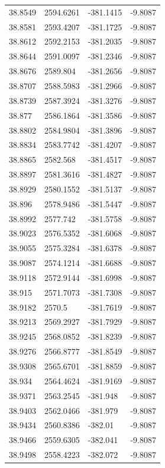 \begin{table}[H]
\begin{tabular}{llll}
38.8549 & 2594.6261 & -381.1415 & -9.8087 \\
38.8581 & 2593.4207 & -381.1725 & -9.8087 \\
38.8612 & 2592.2153 & -381.2035 & -9.8087 \\
38.8644 & 2591.0097 & -381.2346 & -9.8087 \\
38.8676 & 2589.804 & -381.2656 & -9.8087 \\
38.8707 & 2588.5983 & -381.2966 & -9.8087 \\
38.8739 & 2587.3924 & -381.3276 & -9.8087 \\
38.877 & 2586.1864 & -381.3586 & -9.8087 \\
38.8802 & 2584.9804 & -381.3896 & -9.8087 \\
38.8834 & 2583.7742 & -381.4207 & -9.8087 \\
38.8865 & 2582.568 & -381.4517 & -9.8087 \\
38.8897 & 2581.3616 & -381.4827 & -9.8087 \\
38.8929 & 2580.1552 & -381.5137 & -9.8087 \\
38.896 & 2578.9486 & -381.5447 & -9.8087 \\
38.8992 & 2577.742 & -381.5758 & -9.8087 \\
38.9023 & 2576.5352 & -381.6068 & -9.8087 \\
38.9055 & 2575.3284 & -381.6378 & -9.8087 \\
38.9087 & 2574.1214 & -381.6688 & -9.8087 \\
38.9118 & 2572.9144 & -381.6998 & -9.8087 \\
38.915 & 2571.7073 & -381.7308 & -9.8087 \\
38.9182 & 2570.5 & -381.7619 & -9.8087 \\
38.9213 & 2569.2927 & -381.7929 & -9.8087 \\
38.9245 & 2568.0852 & -381.8239 & -9.8087 \\
38.9276 & 2566.8777 & -381.8549 & -9.8087 \\
38.9308 & 2565.6701 & -381.8859 & -9.8087 \\
38.934 & 2564.4624 & -381.9169 & -9.8087 \\
38.9371 & 2563.2545 & -381.948 & -9.8087 \\
38.9403 & 2562.0466 & -381.979 & -9.8087 \\
38.9434 & 2560.8386 & -382.01 & -9.8087 \\
38.9466 & 2559.6305 & -382.041 & -9.8087 \\
38.9498 & 2558.4223 & -382.072 & -9.8087 \\

\end{tabular}
\end{table}
